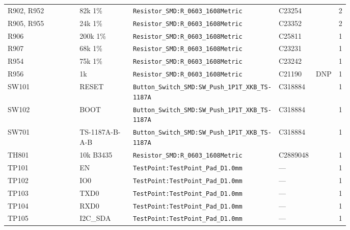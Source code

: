 {\begin{longtable}{@{}>{\raggedright\arraybackslash}p{0.25\linewidth}>{\raggedright\arraybackslash}p{0.17\linewidth}>{\raggedright\arraybackslash}p{0.36\linewidth}l l r@{}}
R902, R952 & 82k 1\% & \texttt{Resistor\_\allowbreak{}SMD:\allowbreak{}R\_\allowbreak{}0603\_\allowbreak{}1608Metric} & C23254 &  & 2\\
R905, R955 & 24k 1\% & \texttt{Resistor\_\allowbreak{}SMD:\allowbreak{}R\_\allowbreak{}0603\_\allowbreak{}1608Metric} & C23352 &  & 2\\
R906 & 200k 1\% & \texttt{Resistor\_\allowbreak{}SMD:\allowbreak{}R\_\allowbreak{}0603\_\allowbreak{}1608Metric} & C25811 &  & 1\\
R907 & 68k 1\% & \texttt{Resistor\_\allowbreak{}SMD:\allowbreak{}R\_\allowbreak{}0603\_\allowbreak{}1608Metric} & C23231 &  & 1\\
R954 & 75k 1\% & \texttt{Resistor\_\allowbreak{}SMD:\allowbreak{}R\_\allowbreak{}0603\_\allowbreak{}1608Metric} & C23242 &  & 1\\
R956 & 1k & \texttt{Resistor\_\allowbreak{}SMD:\allowbreak{}R\_\allowbreak{}0603\_\allowbreak{}1608Metric} & C21190 & DNP & 1\\
SW101 & RESET & \texttt{Button\_\allowbreak{}Switch\_\allowbreak{}SMD:\allowbreak{}SW\_\allowbreak{}Push\_\allowbreak{}1P1T\_\allowbreak{}XKB\_\allowbreak{}TS-1187A} & C318884 &  & 1\\
SW102 & BOOT & \texttt{Button\_\allowbreak{}Switch\_\allowbreak{}SMD:\allowbreak{}SW\_\allowbreak{}Push\_\allowbreak{}1P1T\_\allowbreak{}XKB\_\allowbreak{}TS-1187A} & C318884 &  & 1\\
SW701 & TS-1187A-B-A-B & \texttt{Button\_\allowbreak{}Switch\_\allowbreak{}SMD:\allowbreak{}SW\_\allowbreak{}Push\_\allowbreak{}1P1T\_\allowbreak{}XKB\_\allowbreak{}TS-1187A} & C318884 &  & 1\\
TH801 & 10k B3435 & \texttt{Resistor\_\allowbreak{}SMD:\allowbreak{}R\_\allowbreak{}0603\_\allowbreak{}1608Metric} & C2889048 &  & 1\\
TP101 & EN & \texttt{TestPoint:\allowbreak{}TestPoint\_\allowbreak{}Pad\_\allowbreak{}D1.0mm} & --- &  & 1\\
TP102 & IO0 & \texttt{TestPoint:\allowbreak{}TestPoint\_\allowbreak{}Pad\_\allowbreak{}D1.0mm} & --- &  & 1\\
TP103 & TXD0 & \texttt{TestPoint:\allowbreak{}TestPoint\_\allowbreak{}Pad\_\allowbreak{}D1.0mm} & --- &  & 1\\
TP104 & RXD0 & \texttt{TestPoint:\allowbreak{}TestPoint\_\allowbreak{}Pad\_\allowbreak{}D1.0mm} & --- &  & 1\\
TP105 & I2C\_SDA & \texttt{TestPoint:\allowbreak{}TestPoint\_\allowbreak{}Pad\_\allowbreak{}D1.0mm} & --- &  & 1\\

\end{longtable}}
